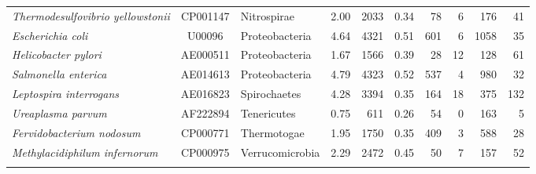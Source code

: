 \begin{landscape}
\begin{longtable}{ l
    				c
				l
				c
				r
				c
				r
				r
				r
				r}
    \textit{Thermodesulfovibrio yellowstonii} & CP001147 & Nitrospirae & 2.00 & 2033 & 0.34 & 78 & 6 & 176 & 41\\
    \textit{Escherichia coli} & U00096 & Proteobacteria & 4.64 & 4321 & 0.51 & 601 & 6 & 1058 & 35\\
    \textit{Helicobacter pylori} & AE000511 & Proteobacteria & 1.67 & 1566 & 0.39 & 28 & 12 & 128 & 61\\
    \textit{Salmonella enterica} & AE014613 & Proteobacteria & 4.79 & 4323 & 0.52 & 537 & 4 & 980 & 32\\
    \textit{Leptospira interrogans} & AE016823 & Spirochaetes & 4.28 & 3394 & 0.35 & 164 & 18 & 375 & 132\\
    \textit{Ureaplasma parvum} & AF222894 & Tenericutes & 0.75 & 611 & 0.26 & 54 & 0 & 163 & 5\\
    \textit{Fervidobacterium nodosum} & CP000771 & Thermotogae & 1.95 & 1750 & 0.35 & 409 & 3 & 588 & 28\\
    \textit{Methylacidiphilum infernorum} & CP000975 & Verrucomicrobia & 2.29 & 2472 & 0.45 & 50 & 7 & 157 & 52\\
    \bottomrule
    \label{tab:genomes}%
    \end{longtable}%
\end{landscape}%
\endgroup

